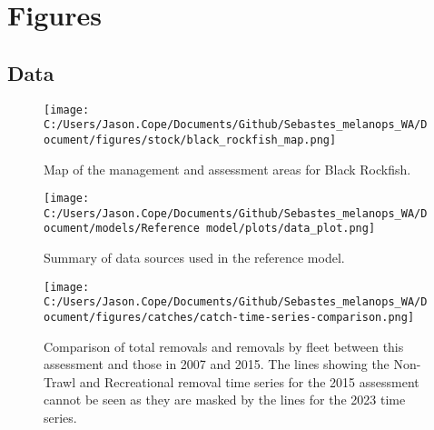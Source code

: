 \documentclass[11pt,
  english,
  letterpaper,
]{article}
\begin{document}
\newpage





\newpage













\newpage



\clearpage

\clearpage


\hypertarget{figures}{%
\section{Figures}\label{figures}}

\hypertarget{data}{%
\subsection{Data}\label{data}}

\begin{figure}
\centering
\texttt{[image: C:/Users/Jason.Cope/Documents/Github/Sebastes\_melanops\_WA/Document/figures/stock/black\_rockfish\_map.png]}
\caption{Map of the management and assessment areas for Black Rockfish.\label{fig:map}}
\end{figure}

\pagebreak

\begin{figure}
\centering
\texttt{[image: C:/Users/Jason.Cope/Documents/Github/Sebastes\_melanops\_WA/Document/models/Reference model/plots/data\_plot.png]}
\caption{Summary of data sources used in the reference model.\label{fig:data-plot}}
\end{figure}

\pagebreak

\begin{figure}
\centering
\texttt{[image: C:/Users/Jason.Cope/Documents/Github/Sebastes\_melanops\_WA/Document/figures/catches/catch-time-series-comparison.png]}
\caption{Comparison of total removals and removals by fleet between this assessment and those in 2007 and 2015. The lines showing the Non-Trawl and Recreational removal time series for the 2015 assessment cannot be seen as they are masked by the lines for the 2023 time series.\label{fig:catch-ts-comparison}}
\end{figure}
\end{document}
